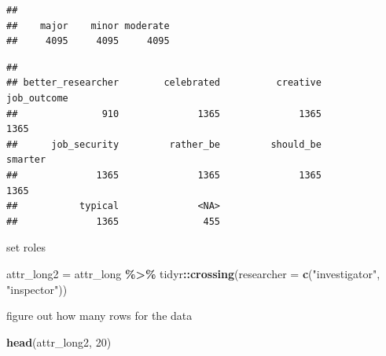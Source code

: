 \documentclass[
]{article}
\newenvironment{Shaded}{\begin{snugshade}}{\end{snugshade}}
\newcommand{\AttributeTok}[1]{\textcolor[rgb]{0.13,0.29,0.53}{#1}}
\newcommand{\DecValTok}[1]{\textcolor[rgb]{0.00,0.00,0.81}{#1}}
\newcommand{\FunctionTok}[1]{\textcolor[rgb]{0.13,0.29,0.53}{\textbf{#1}}}
\newcommand{\NormalTok}[1]{#1}
\newcommand{\OtherTok}[1]{\textcolor[rgb]{0.56,0.35,0.01}{#1}}
\newcommand{\SpecialCharTok}[1]{\textcolor[rgb]{0.81,0.36,0.00}{\textbf{#1}}}
\newcommand{\StringTok}[1]{\textcolor[rgb]{0.31,0.60,0.02}{#1}}
\begin{document}
\begin{verbatim}
## 
##    major    minor moderate 
##     4095     4095     4095
\end{verbatim}

\begin{Shaded}
\end{Shaded}

\begin{verbatim}
## 
## better_researcher        celebrated          creative       job_outcome 
##               910              1365              1365              1365 
##      job_security         rather_be         should_be           smarter 
##              1365              1365              1365              1365 
##           typical              <NA> 
##              1365               455
\end{verbatim}

set roles

\begin{Shaded}
\begin{Highlighting}[]
\NormalTok{attr\_long2 }\OtherTok{=}\NormalTok{ attr\_long }\SpecialCharTok{\%\textgreater{}\%}
\NormalTok{  tidyr}\SpecialCharTok{::}\FunctionTok{crossing}\NormalTok{(}\AttributeTok{researcher =} \FunctionTok{c}\NormalTok{(}\StringTok{"investigator"}\NormalTok{, }\StringTok{"inspector"}\NormalTok{))}
\end{Highlighting}
\end{Shaded}

figure out how many rows for the data

\begin{Shaded}
\begin{Highlighting}[]
\FunctionTok{head}\NormalTok{(attr\_long2, }\DecValTok{20}\NormalTok{)}
\end{Highlighting}
\end{Shaded}
\end{document}
